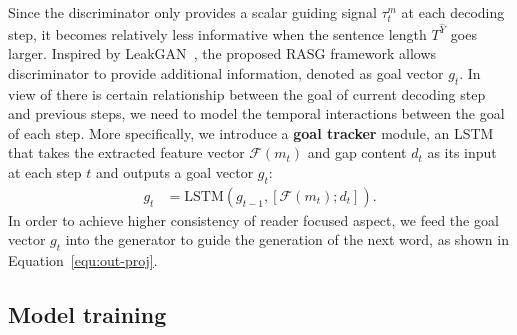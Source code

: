 \documentclass[letterpaper]{article} %
\begin{document}
Since the discriminator only provides a scalar guiding signal $\tau^m_t$ at each decoding step, it becomes relatively less informative when the sentence length $T^{\hat{Y}}$ goes larger. 
Inspired by LeakGAN~\cite{Guo2018LongTG}, the proposed RASG framework allows discriminator to provide additional information, denoted as goal vector $g_t$.
In view of there is certain relationship between the goal of current decoding step and previous steps, we need to model the temporal interactions between the goal of each step.
More specifically, we introduce a \textbf{goal tracker} module, an LSTM that takes the extracted feature vector $\mathcal{F}(m_t)$ and gap content $d_t$ as its input at each step $t$ and outputs a goal vector $g_t$:
\begin{align}
    g_t &= \text{LSTM} (g_{t-1}, [\mathcal{F}(m_t); d_t]) .
\end{align}
In order to achieve higher consistency of reader focused aspect, we feed the goal vector $g_t$ into the generator to guide the generation of the next word, as shown in Equation~\ref{equ:out-proj}.

\subsection{Model training}
\end{document}

